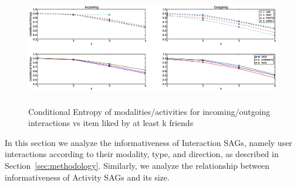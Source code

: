                 

\begin{figure}[tbp!]
\centering
\includegraphics[height=50mm,width=160mm]{data/plots/vsk/ModalityActionsvsKFriends.eps}
\caption{Conditional Entropy  of modalities/activities for incoming/outgoing interactions vs item liked by at least k friends}
\label{Fig2} 
\end{figure}

In this section we analyze the informativeness of Interaction SAGs,
namely user interactions according to their modality, type, and direction, 
as described in Section~\ref{sec:methodology}. Similarly, we analyze the relationship between
informativeness of Activity SAGs and its size.

